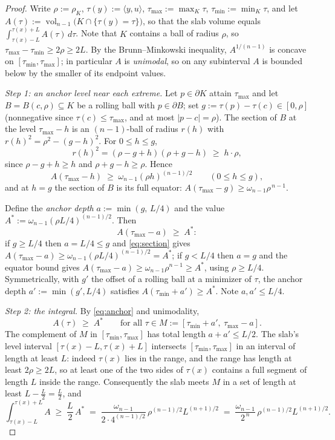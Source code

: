 ﻿\documentclass[11pt]{article}
\newcommand{\vol}{\operatorname{vol}}
\begin{document}
\begin{proof}
Write $\rho:=\rho_K$, $\tau(y):=\langle y,u\rangle$,
$\tau_{\max}:=\max_K\tau$, $\tau_{\min}:=\min_K\tau$, and let
$A(\tau):=\vol_{n-1}\bigl(K\cap\{\tau(y)=\tau\}\bigr)$, so that the slab volume
equals $\int_{\tau(x)-L}^{\tau(x)+L}A(\tau)\,d\tau$.  Note that $K$ contains a
ball of radius $\rho$, so $\tau_{\max}-\tau_{\min}\ge2\rho\ge2L$.  By the
Brunn--Minkowski inequality, $A^{1/(n-1)}$ is concave on
$[\tau_{\min},\tau_{\max}]$; in particular $A$ is \emph{unimodal}, so on any
subinterval $A$ is bounded below by the smaller of its endpoint values.

\emph{Step 1: an anchor level near each extreme.}  Let $p\in\partial K$ attain
$\tau_{\max}$ and let $B=B(c,\rho)\subseteq K$ be a rolling ball with
$p\in\partial B$; set $g:=\tau(p)-\tau(c)\in[0,\rho]$ (nonnegative since
$\tau(c)\le\tau_{\max}$, and at most $|p-c|=\rho$).  The section of $B$ at the
level $\tau_{\max}-h$ is an $(n-1)$-ball of radius $r(h)$ with
$r(h)^2=\rho^2-(g-h)^2$.  For $0\le h\le g$,
\[
r(h)^2=(\rho-g+h)(\rho+g-h)\;\ge\;h\cdot\rho,
\]
since $\rho-g+h\ge h$ and $\rho+g-h\ge\rho$.  Hence
\begin{equation}\label{eq:section}
A(\tau_{\max}-h)\;\ge\;\omega_{n-1}(\rho h)^{(n-1)/2}
\qquad(0\le h\le g),
\end{equation}
and at $h=g$ the section of $B$ is its full equator:
$A(\tau_{\max}-g)\ge\omega_{n-1}\rho^{\,n-1}$.

Define the \emph{anchor depth} $a:=\min(g,\,L/4)$ and the value
$A^*:=\omega_{n-1}(\rho L/4)^{(n-1)/2}$.  Then
\begin{equation}\label{eq:anchor}
A(\tau_{\max}-a)\;\ge\;A^* :
\end{equation}
if $g\ge L/4$ then $a=L/4\le g$ and \eqref{eq:section} gives
$A(\tau_{\max}-a)\ge\omega_{n-1}(\rho L/4)^{(n-1)/2}=A^*$; if $g<L/4$ then
$a=g$ and the equator bound gives
$A(\tau_{\max}-a)\ge\omega_{n-1}\rho^{n-1}\ge A^*$, using $\rho\ge L/4$.
Symmetrically, with $g'$ the offset of a rolling ball at a minimizer of
$\tau$, the anchor depth $a':=\min(g',L/4)$ satisfies
$A(\tau_{\min}+a')\ge A^*$.  Note $a,a'\le L/4$.

\emph{Step 2: the integral.}  By \eqref{eq:anchor} and unimodality,
\[
A(\tau)\;\ge\;A^*
\qquad\text{for all }
\tau\in M:=[\tau_{\min}+a',\ \tau_{\max}-a].
\]
The complement of $M$ in $[\tau_{\min},\tau_{\max}]$ has total length
$a+a'\le L/2$.  The slab's level interval
$[\tau(x)-L,\tau(x)+L]$ intersects $[\tau_{\min},\tau_{\max}]$ in an interval
of length at least $L$: indeed $\tau(x)$ lies in the range, and the range has
length at least $2\rho\ge2L$, so at least one of the two sides of $\tau(x)$
contains a full segment of length $L$ inside the range.  Consequently the slab
meets $M$ in a set of length at least $L-\frac L2=\frac L2$, and
\[
\int_{\tau(x)-L}^{\tau(x)+L}A
\;\ge\;\frac L2\,A^*
\;=\;\frac{\omega_{n-1}}{2\cdot4^{(n-1)/2}}\,\rho^{(n-1)/2}L^{(n+1)/2}
\;=\;\frac{\omega_{n-1}}{2^{\,n}}\,\rho^{(n-1)/2}L^{(n+1)/2}.
\]
\end{proof}
\end{document}
